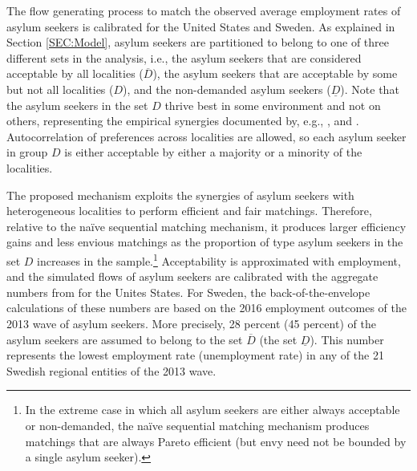 \documentclass[12pt,fleqn]{article}
\begin{document}
The flow generating process to match the observed average employment rates of asylum seekers is calibrated for the United States and Sweden. As explained in Section \ref{SEC:Model}, asylum seekers are partitioned to belong to one of three different sets in the analysis, i.e., the asylum seekers that are considered acceptable by all localities ($\overline{D}$), the asylum seekers that are acceptable by some but not all localities ($D$), and the non-demanded asylum seekers ($\underline{D}$). Note that the asylum seekers in the set $D$ thrive best in some environment and not on others, representing the empirical synergies documented by, e.g., \cite{bib:BansakEtAl}, \citet{bib:Damm} and \citet{bib:EdinEtAl}. Autocorrelation of preferences across localities are allowed, so each asylum seeker in group $D$ is either acceptable by either a majority or a minority of the localities. 

The proposed mechanism exploits the synergies of asylum seekers with heterogeneous localities to perform efficient and fair matchings. Therefore, relative to the na\"{i}ve sequential matching mechanism, it produces larger efficiency gains and less envious matchings as the proportion of type asylum seekers in the set $D$ increases in the sample.\footnote{In the extreme case in which all asylum seekers are either always acceptable or non-demanded, the na\"{i}ve sequential matching mechanism produces matchings that are always Pareto efficient (but envy need not be bounded by a single asylum seeker).} Acceptability is approximated with employment, and the simulated flows of asylum seekers are calibrated with the aggregate numbers from \cite{bib:BansakEtAl} for the Unites States. For Sweden, the back-of-the-envelope calculations of these numbers are based on the 2016 employment outcomes of the 2013 wave of asylum seekers. More precisely, 28 percent (45 percent) of the asylum seekers are assumed to belong to the set $\overline{D}$ (the set $\underline{D}$). This number represents the lowest employment rate (unemployment rate) in any of the 21 Swedish regional entities of the 2013 wave.
\end{document}
